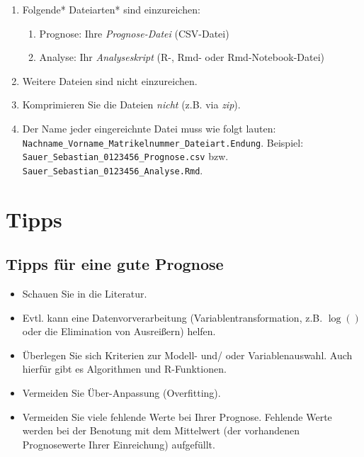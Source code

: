 \documentclass[
]{book}
\providecommand{\tightlist}{%
  \setlength{\itemsep}{0pt}\setlength{\parskip}{0pt}}
\begin{document}
\begin{enumerate}
\def\labelenumi{\arabic{enumi}.}
\item
  Folgende* Dateiarten* sind einzureichen:

  \begin{enumerate}
  \def\labelenumii{\arabic{enumii}.}
  \tightlist
  \item
    Prognose: Ihre \emph{Prognose-Datei} (CSV-Datei)
  \item
    Analyse: Ihr \emph{Analyseskript} (R-, Rmd- oder Rmd-Notebook-Datei)
  \end{enumerate}
\item
  Weitere Dateien sind nicht einzureichen.
\item
  Komprimieren Sie die Dateien \emph{nicht} (z.B. via \emph{zip}).
\item
  Der Name jeder eingereichnte Datei muss wie folgt lauten: \texttt{Nachname\_Vorname\_Matrikelnummer\_Dateiart.Endung}. Beispiel: \texttt{Sauer\_Sebastian\_0123456\_Prognose.csv} bzw. \texttt{Sauer\_Sebastian\_0123456\_Analyse.Rmd}.
\end{enumerate}

\hypertarget{tipps}{%
\section{Tipps}\label{tipps}}

\hypertarget{tipps-fuxfcr-eine-gute-prognose}{%
\subsection{Tipps für eine gute Prognose}\label{tipps-fuxfcr-eine-gute-prognose}}

\begin{itemize}
\item
  Schauen Sie in die Literatur.
\item
  Evtl. kann eine Datenvorverarbeitung (Variablentransformation, z.B. \(\log()\) oder die Elimination von Ausreißern) helfen.
\item
  Überlegen Sie sich Kriterien zur Modell- und/ oder Variablenauswahl. Auch hierfür gibt es Algorithmen und R-Funktionen.
\item
  Vermeiden Sie Über-Anpassung (Overfitting).
\item
  Vermeiden Sie viele fehlende Werte bei Ihrer Prognose. Fehlende Werte werden bei der Benotung mit dem Mittelwert (der vorhandenen Prognosewerte Ihrer Einreichung) aufgefüllt.
\end{itemize}
\end{document}
